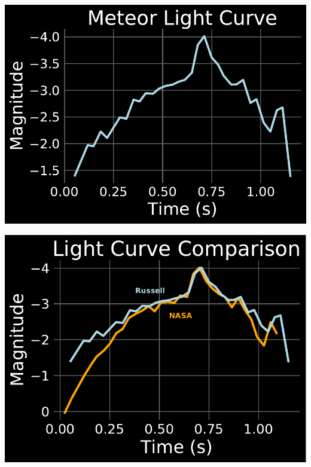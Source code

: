 \documentclass{fancyslides}
\begin{document}


\begin{frame}
\center
\includegraphics[width=.65\linewidth]{MeteorCurve.pdf}
\end{frame}


\begin{frame}
\center
\includegraphics[width=.65\linewidth]{LightComparison0.pdf}
\end{frame}

\end{document}
